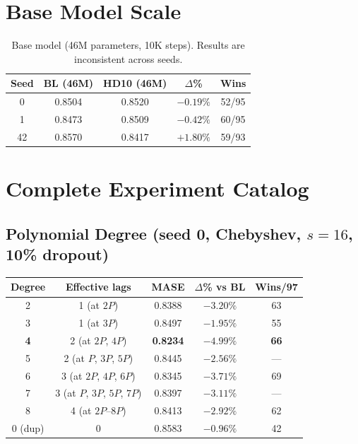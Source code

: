 \documentclass{article}
\begin{document}
\section{Base Model Scale}
\label{app:base}

\begin{table}[h]
\centering
\caption{Base model (46M parameters, 10K steps). Results are inconsistent across seeds.}
\small
\begin{tabular}{ccccc}
\toprule
\textbf{Seed} & \textbf{BL (46M)} & \textbf{HD10 (46M)} & \textbf{$\Delta$\%} & \textbf{Wins} \\
\midrule
0 & 0.8504 & 0.8520 & $-0.19\%$ & 52/95 \\
1 & 0.8473 & 0.8509 & $-0.42\%$ & 60/95 \\
42 & 0.8570 & 0.8417 & $+1.80\%$ & 59/93 \\
\bottomrule
\end{tabular}
\end{table}

\section{Complete Experiment Catalog}
\label{app:catalog}

\subsection{Polynomial Degree (seed 0, Chebyshev, $s{=}16$, 10\% dropout)}

\begin{table}[h]
\centering
\small
\begin{tabular}{ccccc}
\toprule
\textbf{Degree} & \textbf{Effective lags} & \textbf{MASE} & \textbf{$\Delta$\% vs BL} & \textbf{Wins/97} \\
\midrule
2 & 1 (at $2P$) & 0.8388 & $-3.20\%$ & 63 \\
3 & 1 (at $3P$) & 0.8497 & $-1.95\%$ & 55 \\
\textbf{4} & 2 (at $2P$, $4P$) & \textbf{0.8234} & $-4.99\%$ & \textbf{66} \\
5 & 2 (at $P$, $3P$, $5P$) & 0.8445 & $-2.56\%$ & --- \\
6 & 3 (at $2P$, $4P$, $6P$) & 0.8345 & $-3.71\%$ & 69 \\
7 & 3 (at $P$, $3P$, $5P$, $7P$) & 0.8397 & $-3.11\%$ & --- \\
8 & 4 (at $2P$--$8P$) & 0.8413 & $-2.92\%$ & 62 \\
0 (dup) & 0 & 0.8583 & $-0.96\%$ & 42 \\
\bottomrule
\end{tabular}
\end{table}
\end{document}
